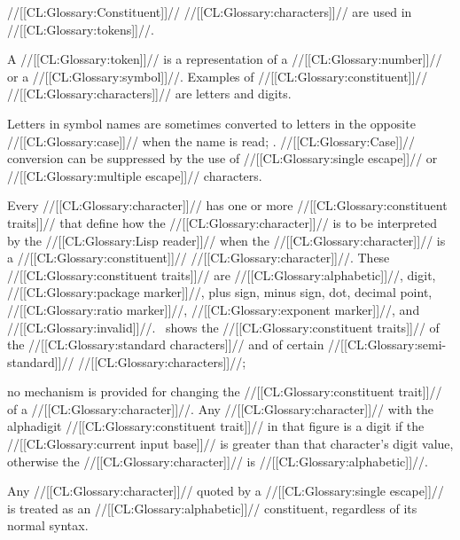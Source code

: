 
//[[CL:Glossary:Constituent]]// //[[CL:Glossary:characters]]// are used in //[[CL:Glossary:tokens]]//.


A //[[CL:Glossary:token]]// is a representation of a //[[CL:Glossary:number]]// or a //[[CL:Glossary:symbol]]//.  
Examples of //[[CL:Glossary:constituent]]// //[[CL:Glossary:characters]]// are letters and digits.


Letters in symbol names are sometimes converted to 
letters in the opposite //[[CL:Glossary:case]]// when the name is read;
\seesection\ReadtableCaseReadEffect.
//[[CL:Glossary:Case]]// conversion can be suppressed by the use 
of //[[CL:Glossary:single escape]]// or //[[CL:Glossary:multiple escape]]// characters.






Every //[[CL:Glossary:character]]// has one or more //[[CL:Glossary:constituent traits]]//
that define how the //[[CL:Glossary:character]]// is to be interpreted by the //[[CL:Glossary:Lisp reader]]//
when the //[[CL:Glossary:character]]// is a //[[CL:Glossary:constituent]]// //[[CL:Glossary:character]]//.
These //[[CL:Glossary:constituent traits]]// are 
     //[[CL:Glossary:alphabetic]]//,                  
     digit,
     //[[CL:Glossary:package marker]]//,
     plus sign,
     minus sign, 
     dot,
     decimal point,
     //[[CL:Glossary:ratio marker]]//,
     //[[CL:Glossary:exponent marker]]//,
 and //[[CL:Glossary:invalid]]//.
\Figref\ConstituentTraitsOfStdChars\ shows the //[[CL:Glossary:constituent traits]]//
of the //[[CL:Glossary:standard characters]]//
and of certain //[[CL:Glossary:semi-standard]]// //[[CL:Glossary:characters]]//;


no mechanism is provided for changing the //[[CL:Glossary:constituent trait]]// of a //[[CL:Glossary:character]]//.
Any //[[CL:Glossary:character]]// with the alphadigit //[[CL:Glossary:constituent trait]]//
in that figure is a digit if the //[[CL:Glossary:current input base]]// is greater
than that character's digit value,
otherwise the //[[CL:Glossary:character]]// is //[[CL:Glossary:alphabetic]]//.  


Any //[[CL:Glossary:character]]// quoted by a //[[CL:Glossary:single escape]]// 
is treated as an //[[CL:Glossary:alphabetic]]// constituent, regardless of its normal syntax.

